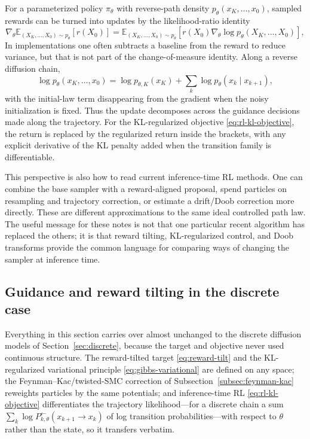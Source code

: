\documentclass[10pt,a4paper]{amsart}
\numberwithin{equation}{section}
\newcommand{\E}{\mathbb{E}}
\begin{document}
For a parameterized policy $\pi_\theta$ with reverse-path density
$p_\theta(x_K,\ldots,x_0)$, sampled rewards can be turned into updates by the
likelihood-ratio identity
\[
    \nabla_\theta\E_{(X_K,\ldots,X_0)\sim p_\theta}[r(X_0)]
    =
    \E_{(X_K,\ldots,X_0)\sim p_\theta}
    \left[
    r(X_0)\nabla_\theta\log p_\theta(X_K,\ldots,X_0)
    \right],
\]
In implementations one often subtracts a baseline from the reward to reduce
variance, but that is not part of the change-of-measure identity.  Along a
reverse diffusion chain,
\[
    \log p_\theta(x_K,\ldots,x_0)
    =
    \log p_{\theta,K}(x_K)
    +
    \sum_k \log p_\theta(x_k\mid x_{k+1}),
\]
with the initial-law term disappearing from the gradient when the noisy
initialization is fixed.  Thus the update decomposes across the guidance
decisions made along the trajectory.
For the KL-regularized objective \eqref{eq:rl-kl-objective}, the
return is replaced by the regularized return inside the brackets, with any
explicit derivative of the KL penalty added when the transition family is
differentiable.

This perspective is also how to read current inference-time RL methods.
One can combine the base sampler with a reward-aligned proposal, spend particles
on resampling and trajectory correction, or estimate a drift/Doob correction
more directly.  These are different approximations to the same ideal controlled
path law.  The useful message for these notes is not that one particular recent
algorithm has replaced the others; it is that reward tilting, KL-regularized
control, and Doob transforms provide the common language for comparing ways of
changing the sampler at inference time.

\subsection{Guidance and reward tilting in the discrete case}

Everything in this section carries over almost unchanged to the discrete
diffusion models of Section~\ref{sec:discrete}, because the target and objective
never used continuous structure.  The
reward-tilted target \eqref{eq:reward-tilt} and the KL-regularized variational
principle \eqref{eq:gibbs-variational} are defined on any space; the
Feynman--Kac/twisted-SMC correction of Subsection~\ref{subsec:feynman-kac}
reweights particles by the same potentials; and inference-time RL
\eqref{eq:rl-kl-objective} differentiates the trajectory
likelihood---for a discrete chain a sum
$\sum_k\log P_{k,\theta}^{\leftarrow}(x_{k+1}\to x_k)$ of log transition
probabilities---with respect to $\theta$ rather than the state, so it transfers
verbatim.
\end{document}

